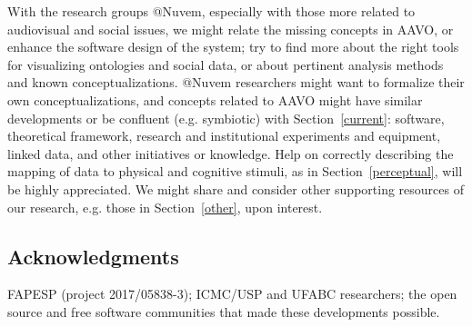 \documentclass[letterpaper,10pt]{article}
\begin{document}
With the research groups @Nuvem, 
especially with those more related to audiovisual and social issues,
we might relate the missing concepts in AAVO,
or enhance the software design of the system;
try to find more about the right tools for visualizing
ontologies and social data, or about
pertinent analysis methods and known conceptualizations.
@Nuvem researchers might want to formalize their own conceptualizations,
and concepts related to AAVO might have similar developments
or be confluent (e.g. symbiotic)
with Section~\ref{current}: software,
theoretical framework, research and institutional experiments and equipment,
linked data, and other initiatives or knowledge.
Help on correctly describing the mapping of data to physical
and cognitive stimuli, as in Section~\ref{perceptual},
will be highly appreciated.
We might share and consider other supporting resources of our
research, e.g. those in Section~\ref{other}, upon
interest.

\subsection{Acknowledgments}
FAPESP (project 2017/05838-3); ICMC/USP and UFABC researchers;
the open source and free software communities that
made these developments possible. 
\end{document}
